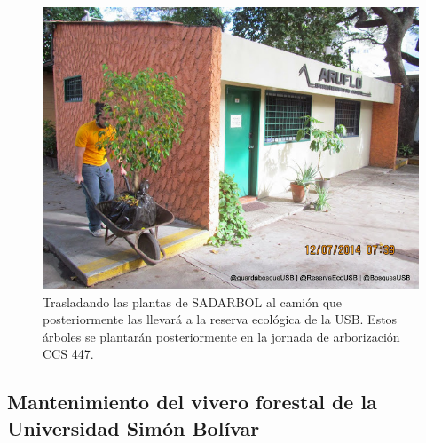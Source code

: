 \begin{itemize}
\begin{figure}[H]
    \centering
    \includegraphics[scale=0.5]{imagenes/foto2}
    \caption{Trasladando las plantas de SADARBOL al camión que posteriormente las llevará a la reserva ecológica de la USB. Estos árboles se plantarán posteriormente en la jornada de arborización CCS 447.}
    \label{foto2}
\end{figure}

\end{itemize}

\subsection*{Mantenimiento del vivero forestal de la Universidad Simón Bolívar}

